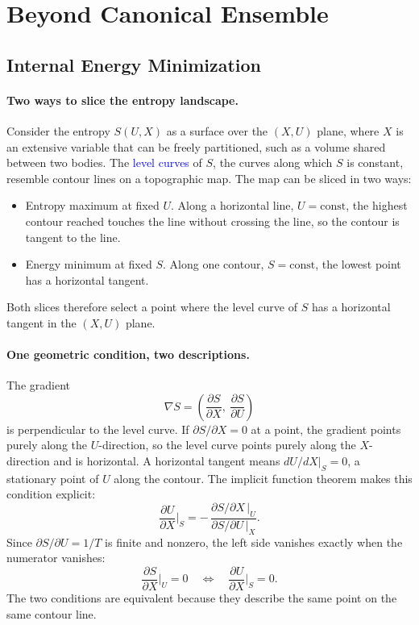 \section{Beyond Canonical Ensemble}

\subsection{Internal Energy Minimization}

\paragraph{Two ways to slice the entropy landscape.}
Consider the entropy $S(U,X)$ as a surface over the $(X,U)$ plane, where $X$
is an extensive variable that can be freely partitioned, such as a volume
shared between two bodies. The \textcolor{blue}{level curves} of $S$, the
curves along which $S$ is constant, resemble contour lines on a topographic
map. The map can be sliced in two ways:
\begin{itemize}
    \item Entropy maximum at fixed $U$. Along a horizontal line,
    $U=\text{const}$, the highest contour reached touches the line without
    crossing the line, so the contour is tangent to the line.
    \item Energy minimum at fixed $S$. Along one contour,
    $S=\text{const}$, the lowest point has a horizontal tangent.
\end{itemize}
Both slices therefore select a point where the level curve of $S$ has a
horizontal tangent in the $(X,U)$ plane.

\paragraph{One geometric condition, two descriptions.}
The gradient
\begin{equation*}
    \nabla S = \left(\frac{\partial S}{\partial X},\
    \frac{\partial S}{\partial U}\right)
\end{equation*}
is perpendicular to the level curve. If $\partial S/\partial X=0$ at a point,
the gradient points purely along the $U$-direction, so the level curve points
purely along the $X$-direction and is horizontal. A horizontal tangent means
$dU/dX|_S=0$, a stationary point of $U$ along the contour. The implicit
function theorem makes this condition explicit:
\begin{equation}
    \boxed{\frac{\partial U}{\partial X}\bigg|_S
    = -\,\frac{\partial S/\partial X\,|_U}{\partial S/\partial U\,|_X}.}
\end{equation}
Since $\partial S/\partial U=1/T$ is finite and nonzero, the left side
vanishes exactly when the numerator vanishes:
\begin{equation}
    \boxed{\frac{\partial S}{\partial X}\bigg|_U=0
    \quad\Longleftrightarrow\quad
    \frac{\partial U}{\partial X}\bigg|_S=0.}
\end{equation}
The two conditions are equivalent because they describe the same point on
the same contour line.

